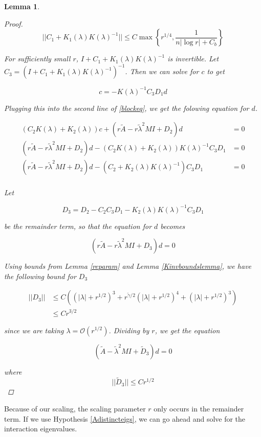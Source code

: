 \documentclass[12pt]{article}
\newtheorem{lemma}{Lemma}
\begin{document}
\begin{lemma}
\begin{proof}
\[
||C_1 + K_1(\lambda)K(\lambda)^{-1}|| \leq C \max \left\{ r^{1/4}, \frac{1}{n |\log r| + C_b } \right\}
\]

For sufficiently small $r$, $I + C_1 + K_1(\lambda)K(\lambda)^{-1}$ is invertible. Let $C_3 = (I + C_1 + K_1(\lambda)K(\lambda)^{-1})^{-1}$. Then we can solve for $c$ to get

\[
c = -K(\lambda)^{-1} C_3 D_1 d
\]

Plugging this into the second line of \eqref{blockeq}, we get the folowing equation for $d$.

\begin{align*}
(C_2 K(\lambda) + K_2(\lambda))c + (r\tilde{A} - r \tilde{\lambda}^2 MI + D_2)d &= 0 \\
(r\tilde{A} - r \tilde{\lambda}^2 MI + D_2)d - (C_2 K(\lambda) + K_2(\lambda))K(\lambda)^{-1} C_3 D_1 &= 0 \\
(r\tilde{A} - r \tilde{\lambda}^2 MI + D_2)d - (C_2 + K_2(\lambda)K(\lambda)^{-1}) C_3 D_1 &= 0 \\
\end{align*}

Let 

\[
D_3 = D_2 - C_2 C_3 D_1 - K_2(\lambda) K(\lambda)^{-1} C_3 D_1
\]

be the remainder term, so that the equation for $d$ becomes

\[
(r\tilde{A} - r \tilde{\lambda}^2 MI + D_3)d = 0
\]

Using bounds from Lemma \ref{reparam} and Lemma \ref{Kinvboundslemma}, we have the following bound for $D_3$

\begin{align*}
||D_3|| &\leq C \left( (|\lambda| + r^{1/2})^3 + r^{\tilde{\gamma}/2}(|\lambda| + r^{1/2})^4 + (|\lambda| + r^{1/2})^3 \right) \\
&\leq C r^{3/2}
\end{align*}

since we are taking $\lambda = \mathcal{O}(r^{1/2})$. Dividing by $r$, we get the equation 

\[
(\tilde{A} - \tilde{\lambda}^2 MI + \tilde{D}_3)d = 0
\]

where 
\[
||\tilde{D}_3|| \leq C r^{1/2}
\]

\end{proof}
\end{lemma}

Because of our scaling, the scaling parameter $r$ only occurs in the remainder term. If we use Hypothesis \ref{Adistincteigs}, we can go ahead and solve for the interaction eigenvalues.
\end{document}
